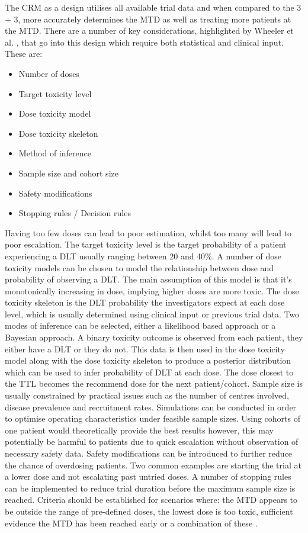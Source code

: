 \documentclass[a4paper, 11pt]{article} %
\begin{document}
\noindent The CRM as a design utilises all available trial data and when compared to the 3 + 3, more accurately determines the MTD as well as treating more patients at the MTD. There are a number of key considerations, highlighted by Wheeler et al. \cite{Wheeler2019}, that go into this design which require both statistical and clinical input. These are: 
\begin{itemize}
	\item Number of doses 
	\item Target toxicity level
	\item Dose toxicity model
	\item Dose toxicity skeleton 
	\item Method of inference 
	\item Sample size and cohort size
	\item Safety modifications 
	\item Stopping rules / Decision rules
\end{itemize}
Having too few doses can lead to poor estimation, whilst too many will lead to poor escalation. The target toxicity level is the target probability of a patient experiencing a DLT usually ranging between 20 and 40\%. A number of dose toxicity models can be chosen to model the relationship between dose and probability of observing a DLT. The main assumption of this model is that it's monotonically increasing in dose, implying higher doses are more toxic. The dose toxicity skeleton is the  DLT  probability the investigators expect at each dose level, which is usually determined using clinical input or previous trial data. Two modes of inference can be selected, either a likelihood based approach or a Bayesian approach. A binary toxicity outcome is observed from each patient, they either have a DLT or they do not. This data is then used in the dose toxicity model along with the dose toxicity skeleton to produce a posterior distribution which can be used to infer probability of DLT at each dose. The dose closest to the TTL becomes the recommend dose for the next patient/cohort. Sample size is usually constrained by practical issues such as the number of centres involved, disease prevalence and recruitment rates. Simulations can be conducted in order to optimise operating characteristics under feasible sample sizes. Using cohorts of one patient would theoretically provide the best results however, this may potentially be harmful to patients due to quick escalation without observation of necessary safety data. Safety modifications can be introduced to further reduce the chance of overdosing patients. Two common examples are starting the trial at a lower dose and not escalating past untried doses. A number of stopping rules can be implemented to reduce trial duration before the maximum sample size is reached. Criteria should be established for scenarios where: the MTD appears to be outside the range of pre-defined doses, the lowest dose is too toxic, sufficient evidence the MTD has been reached early or a combination of these \cite{Wheeler2019}.        \\ 
\end{document}
